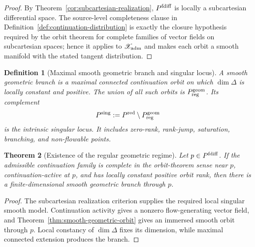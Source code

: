 \documentclass[11pt]{article}
\newtheorem{theorem}{Theorem}[section]
\newtheorem{definition}[theorem]{Definition}
\theoremstyle{remark}
\begin{document}
\begin{proof}
By Theorem~\ref{cor:subcartesian-realization}, $P^{\rm fdiff}$ is locally a
subcartesian differential space.  The source-level completeness clause in Definition~\ref{def:continuation-distribution} is exactly the closure hypothesis required by the orbit theorem for complete families of vector fields on subcartesian spaces; hence it applies to $\mathscr X_{\rm adm}$ and
makes each orbit a smooth manifold with the stated tangent distribution.
\end{proof}

\begin{definition}[Maximal smooth geometric branch and singular locus]
\label{def:maximal-smooth-branch}
A \emph{smooth geometric branch} is a maximal connected continuation orbit on
which $\dim\Delta$ is locally constant and positive.  The union of all such
orbits is $P^{\rm geom}_{\rm reg}$.  Its complement
\[
        P^{\rm sing}:=P^{\rm red}\setminus P^{\rm geom}_{\rm reg}
\]
is the intrinsic singular locus.  It includes zero-rank, rank-jump,
saturation, branching, and non-flowable points.
\end{definition}

\begin{theorem}[Existence of the regular geometric regime]
\label{thm:primitive-regular-regime}
Let $p\in P^{\rm fdiff}$.  If the admissible continuation family is complete in the orbit-theorem sense near $p$, continuation-active at $p$, and has locally constant
positive orbit rank, then there is a finite-dimensional smooth geometric
branch through $p$.
\end{theorem}

\begin{proof}
The subcartesian realization criterion supplies the required local singular
smooth model.  Continuation activity gives a nonzero flow-generating vector
field, and Theorem~\ref{thm:smooth-geometric-orbit} gives an immersed smooth
orbit through $p$.  Local constancy of $\dim\Delta$ fixes its dimension, while
maximal connected extension produces the branch.
\end{proof}
\end{document}
